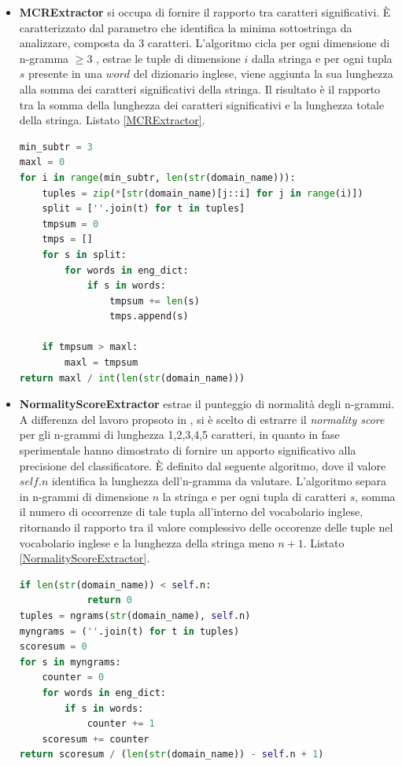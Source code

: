 \begin{itemize}
\item \textbf{MCRExtractor} si occupa di fornire il rapporto tra caratteri significativi. \`E caratterizzato dal parametro che identifica la minima sottostringa da analizzare, composta da 3 caratteri. L'algoritmo cicla per ogni dimensione di n-gramma $\geq 3$ , estrae le tuple di dimensione $i$ dalla stringa e per ogni tupla $s$ presente in una $word$ del dizionario inglese, viene aggiunta la sua lunghezza alla somma dei caratteri significativi della stringa. 
Il risultato è il rapporto tra la somma della lunghezza dei caratteri significativi e la lunghezza totale della stringa. Listato \ref{MCRExtractor}.

\begin{minipage}{\lstlisting\noindent}
\begin{lstlisting}[language=Python, caption={MCRExtractor}, label={MCRExtractor}]
min_subtr = 3
maxl = 0
for i in range(min_subtr, len(str(domain_name))):
	tuples = zip(*[str(domain_name)[j::i] for j in range(i)])
	split = [''.join(t) for t in tuples]
	tmpsum = 0
	tmps = []
	for s in split:
		for words in eng_dict:
			if s in words:
				tmpsum += len(s)
				tmps.append(s)

	if tmpsum > maxl:
		maxl = tmpsum
return maxl / int(len(str(domain_name)))
\end{lstlisting}
\end{minipage}

\item \textbf{NormalityScoreExtractor} estrae il punteggio di normalità degli n-grammi. A differenza del lavoro propsoto in \cite{Schiavoni2014}, si è scelto di estrarre il \textit{normality score} per gli n-grammi di lunghezza 1,2,3,4,5 caratteri, in quanto in fase sperimentale hanno dimostrato di fornire un apporto significativo alla precisione del classificatore. \`E definito dal seguente algoritmo, dove il valore $self.n$ identifica la lunghezza dell'n-gramma da valutare. L'algoritmo separa in n-grammi di dimensione $n$ la stringa e per ogni tupla di caratteri $s$, somma il numero di occorrenze di tale tupla all'interno del vocabolario inglese, ritornando il rapporto tra il valore complessivo delle occorenze delle tuple nel vocabolario inglese e la lunghezza della stringa meno $n+1$. Listato \ref{NormalityScoreExtractor}.

\begin{minipage}{\lstlisting\noindent}
\begin{lstlisting}[language=Python, caption={NormalityScoreExtractor}, label={NormalityScoreExtractor}]
if len(str(domain_name)) < self.n:
            return 0
tuples = ngrams(str(domain_name), self.n)
myngrams = (''.join(t) for t in tuples)
scoresum = 0
for s in myngrams:
	counter = 0
    for words in eng_dict:
    	if s in words:
        	counter += 1
    scoresum += counter
return scoresum / (len(str(domain_name)) - self.n + 1)
\end{lstlisting}


\end{minipage}
\end{itemize}
